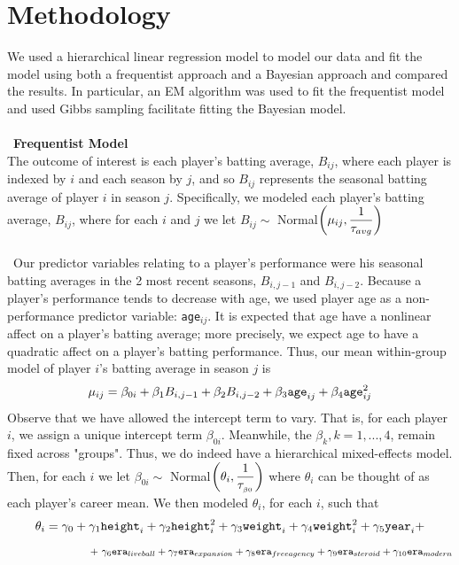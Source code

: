 \documentclass[10pt,a4paper]{article}
\begin{document}
\section*{\large Methodology}
We used a hierarchical linear regression model to model our data and fit the model using both a frequentist approach and a Bayesian approach and compared the results. In particular, an EM algorithm was used to fit the frequentist model and used Gibbs sampling facilitate fitting the Bayesian model.  \\
\\\
\textbf{\small Frequentist Model}\\
The outcome of interest is each player's batting average, $B_{ij}$, where each player is indexed by $i$ and each season by $j$, and so $B_{ij}$ represents the seasonal batting average of player $i$ in season $j$. Specifically, we modeled each player's batting average, $B_{ij}$, where for each $i$ and $j$ we let $B_{ij} \sim$ Normal$\mathlarger{\left(\mu_{ij}, \frac{1}{\tau_{avg}}\right)}$ \\
\\\
Our predictor variables relating to a player's performance were his seasonal batting averages in the 2 most recent seasons, $B_{i, j-1}$ and $B_{i, j-2}$. Because a player's performance tends to decrease with age, we used player age as a non-performance predictor variable: \texttt{age}$_{ij}$. It is expected that age have a nonlinear affect on a player's batting average; more precisely, we expect age to have a quadratic affect on a player's batting performance. Thus, our mean within-group model of player $i$'s batting average in season $j$ is $$\mu_{ij} = \beta_{0i} + \beta_1B_{i, j-1} + \beta_2B_{i, j-2} + \beta_3\textrm{\texttt{age}}_{ij} + \beta_4\textrm{\texttt{age}}_{ij}^2$$
Observe that we have allowed the intercept term to vary. That is, for each player $i$, we assign a unique intercept term $\beta_{0i}$. Meanwhile, the $\beta_k, k = 1,...,4$, remain fixed across "groups". Thus, we do indeed have a hierarchical mixed-effects model. \\
Then, for each $i$ we let $\beta_{0i} \sim$ Normal$\mathlarger{\left(\theta_i, \frac{1}{\tau_{_{\beta0}}}\right)}$ where $\theta_i$ can be thought of as each player's career mean. We then modeled $\theta_i$, for each $i$, such that $$\theta_i = \gamma_0 + \gamma_1\textrm{\texttt{height}}_{i} + \gamma_2\textrm{\texttt{height}}_{i}^2 + \gamma_3\textrm{\texttt{weight}}_{i} + \gamma_4\textrm{\texttt{weight}}_{i}^2 + \gamma_5\textrm{\texttt{year}}_{i} + $$ $$ \ \ \ \ \ \ \ \ \ \ \ \ \ \ \ \ \ \ \ \ \ \ \ \ + \ \gamma_6\textrm{\texttt{era}}_{liveball} + \gamma_7\textrm{\texttt{era}}_{expansion} + \gamma_8\textrm{\texttt{era}}_{freeagency} + \gamma_9\textrm{\texttt{era}}_{steroid} + \gamma_{10}\textrm{\texttt{era}}_{modern}$$
\end{document}
